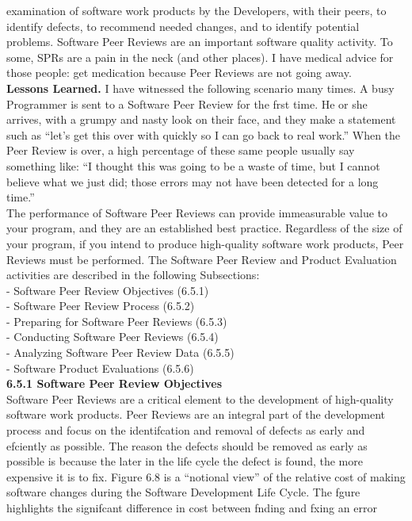 \documentclass[twocolumn,a4paper,13pt]{book}
\begin{document}
examination of software work products by the Developers,
with their peers, to identify defects, to recommend needed
changes, and to identify potential problems. Software Peer
Reviews are an important software quality activity.
To some, SPRs are a pain in the neck (and other places). I have medical advice for those people: get medication because Peer Reviews are not going away.\\
\textbf{Lessons Learned.}
I have witnessed the following
scenario many times. A busy Programmer is sent
to a Software Peer Review for the frst time. He
or she arrives, with a grumpy and nasty look on
their face, and they make a statement such as “let’s
get this over with quickly so I can go back to real
work.” When the Peer Review is over, a high percentage of these same people usually say something
like: “I thought this was going to be a waste of
time, but I cannot believe what we just did; those
errors may not have been detected for a long time.”\\
The performance of Software Peer Reviews can provide
immeasurable value to your program, and they are an established best practice. Regardless of the size of your program, if
you intend to produce high-quality software work products,
Peer Reviews must be performed. The Software Peer Review
and Product Evaluation activities are described in the following Subsections:\\- Software Peer Review Objectives (6.5.1)\\
- Software Peer Review Process (6.5.2)\\
- Preparing for Software Peer Reviews (6.5.3)\\
- Conducting Software Peer Reviews (6.5.4)\\
- Analyzing Software Peer Review Data (6.5.5)\\
- Software Product Evaluations (6.5.6)\\
\textbf{ 6.5.1 Software Peer Review Objectives}\\
Software Peer Reviews are a critical element to the development of high-quality software work products. Peer Reviews
are an integral part of the development process and focus on
the identifcation and removal of defects as early and efciently as possible. The reason the defects should be removed
as early as possible is because the later in the life cycle the
defect is found, the more expensive it is to fix.
Figure 6.8 is a “notional view” of the relative cost
of making software changes during the Software
Development Life Cycle. The fgure highlights the signifcant diﬀerence in cost between fnding and fxing an error
\end{document}
